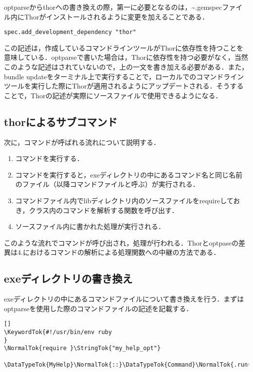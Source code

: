\documentclass[11pt,dvipdfmx]{jsarticle}
\providecommand{\tightlist}{%
      \setlength{\itemsep}{0pt}\setlength{\parskip}{0pt}}
\newcommand{\KeywordTok}[1]{\textcolor[rgb]{0.00,0.44,0.13}{\textbf{{#1}}}}
\newcommand{\DataTypeTok}[1]{\textcolor[rgb]{0.56,0.13,0.00}{{#1}}}
\newcommand{\StringTok}[1]{\textcolor[rgb]{0.25,0.44,0.63}{{#1}}}
\newcommand{\NormalTok}[1]{{#1}}
\begin{document}
optparseからthorへの書き換えの際，第一に必要となるのは，\textasciitilde{}.gemspecファイル内にThorがインストールされるように変更を加えることである．

\begin{verbatim}
spec.add_development_dependency "thor"
\end{verbatim}

この記述は，作成しているコマンドラインツールがThorに依存性を持つことを意味している．optparseで書いた場合は，Thorに依存性を持つ必要がなく，当然このような記述はされていないので，上の一文を書き加える必要がある．また，bundle
updateをターミナル上で実行することで，ローカルでのコマンドラインツールを実行した際にThorが適用されるようにアップデートされる．そうすることで，Thorの記述が実際にソースファイルで使用できるようになる．

\subsection{thorによるサブコマンド}\label{thorux306bux3088ux308bux30b5ux30d6ux30b3ux30deux30f3ux30c9}

次に，コマンドが呼ばれる流れについて説明する．

\begin{enumerate}
\def\labelenumi{\arabic{enumi}.}
\tightlist
\item
  コマンドを実行する．
\item
  コマンドを実行すると，exeディレクトリの中にあるコマンド名と同じ名前のファイル（以降コマンドファイルと呼ぶ）が実行される．
\item
  コマンドファイル内でlibディレクトリ内のソースファイルをrequireしておき，クラス内のコマンドを解析する関数を呼び出す．
\item
  ソースファイル内に書かれた処理が実行される．
\end{enumerate}

このような流れでコマンドが呼び出され，処理が行われる．Thorとoptpaseの差異は4.におけるコマンドの解析による処理関数への中継の方法である．

\subsection{exeディレクトリの書き換え}\label{exeux30c7ux30a3ux30ecux30afux30c8ux30eaux306eux66f8ux304dux63dbux3048}

exeディレクトリの中にあるコマンドファイルについて書き換えを行う．まずはoptparseを使用した際のコマンドファイルの記述を記載する．

\begin{screen}
{\small
\begin{verbatim}[]
\KeywordTok{#!/usr/bin/env ruby                                                                                                               }
\NormalTok{require }\StringTok{"my_help_opt"}

\DataTypeTok{MyHelp}\NormalTok{::}\DataTypeTok{Command}\NormalTok{.run(}\DataTypeTok{ARGV}\NormalTok{)}
\end{verbatim}}
\end{screen}
\end{document}
